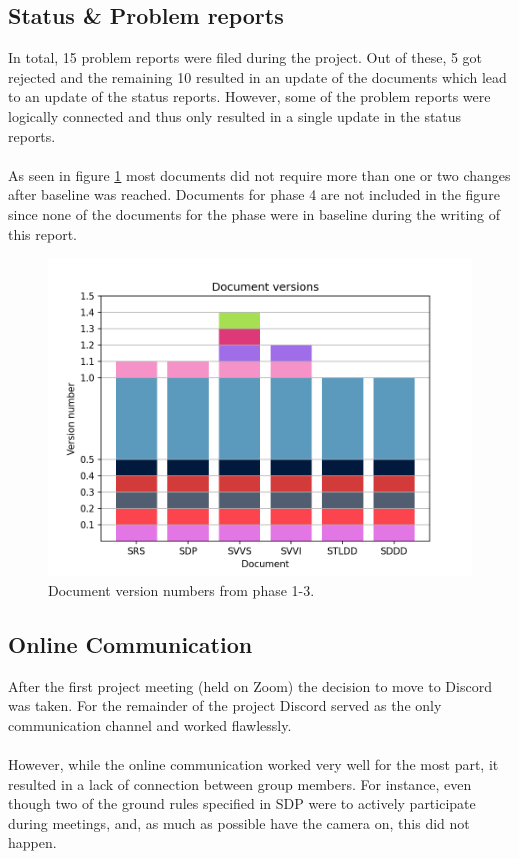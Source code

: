 \documentclass{article}
\begin{document}
    \subsection{Status \& Problem reports}
        In total, 15 problem reports were filed during the project. Out of these, 5 got rejected and the remaining 10 resulted in an update of the documents which lead to an update of the status reports.
        However, some of the problem reports were logically connected and thus only resulted
        in a single update in the status reports.
        \\ \\
        As seen in figure \ref{fig:versions} most documents did not require more than one or two changes
        after baseline was reached. Documents for phase 4 are not included in the figure since none of the documents
        for the phase were in baseline during the writing of this report.
        
        \begin{figure}[!htb]
            \centering
              \includegraphics[width=\linewidth]{images/document_versions.png}
              \caption{Document version numbers from phase 1-3.}\label{fig:versions}
            \endminipage\hfill
        \end{figure}
        
    \subsection{Online Communication \label{communication}}
        After the first project meeting (held on Zoom) the decision to move to
        Discord was taken. For the remainder of the project Discord served as the only communication channel
        and worked flawlessly.
        \\ \\
        However, while the online communication worked very well for the most part, it resulted
        in a lack of connection between group members. For instance, even though two of
        the ground rules specified in SDP were to actively participate during meetings,
        and, as much as possible have the camera on, this did not happen.
\end{document}

